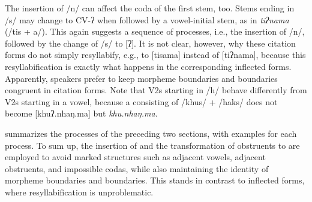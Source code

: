 The insertion of /n/ can affect the coda of the first stem, too. Stems ending in /s/ may  change to CV-ʔ when followed by a vowel-initial stem, as in \emph{tiʔnama}  (/tis + a/). This  again suggests a sequence of processes, i.e., the insertion of /n/, followed by the change of /s/ to [ʔ]. It is not clear, however, why these citation forms do not simply resyllabify, e.g., to [tisama] instead of [tiʔnama], because this resyllabification is exactly what happens in the corresponding inflected forms. Apparently, speakers prefer to keep morpheme boundaries and  boundaries congruent in citation forms. Note that V2s starting in /h/ behave differently from V2s starting in a vowel, because a  consisting of /khus/  + /haks/ does not become [khuʔ.nhaŋ.ma] but \emph{khu.nhaŋ.ma}.

 summarizes the processes of the preceding two sections, with examples for each process. To sum up, the insertion of  and the transformation of obstruents to  are employed to avoid marked structures such as adjacent vowels, adjacent obstruents, and impossible  codas, while also maintaining the identity of  morpheme boundaries and  boundaries. This stands in contrast to inflected forms, where resyllabification is unproblematic.

\begin{table}[htp]
\caption{Repair operations in complex predicates involving nasals}\label{nas-sum}

\end{table}



